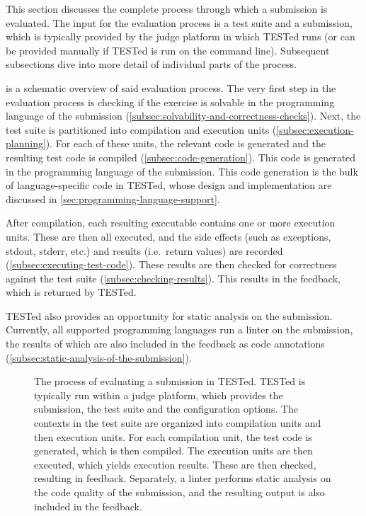 \documentclass[../main]{subfiles}
\begin{document}
This section discusses the complete process through which a submission is evaluated.
The input for the evaluation process is a test suite and a submission, which is typically provided by the judge platform in which TESTed runs (or can be provided manually if TESTed is run on the command line).
Subsequent subsections dive into more detail of individual parts of the process.

 is a schematic overview of said evaluation process.
The very first step in the evaluation process is checking if the exercise is solvable in the programming language of the submission (\cref{subsec:solvability-and-correctness-checks}).
Next, the test suite is partitioned into compilation and execution units (\cref{subsec:execution-planning}).
For each of these units, the relevant code is generated and the resulting test code is compiled (\cref{subsec:code-generation}).
This code is generated in the programming language of the submission.
This code generation is the bulk of language-specific code in TESTed, whose design and implementation are discussed in \cref{sec:programming-language-support}.

After compilation, each resulting executable contains one or more execution units.
These are then all executed, and the side effects (such as exceptions, stdout, stderr, etc.) and results (i.e.\ return values) are recorded (\cref{subsec:executing-test-code}).
These results are then checked for correctness against the test suite (\cref{subsec:checking-results}).
This results in the feedback, which is returned by TESTed.

TESTed also provides an opportunity for static analysis on the submission.
Currently, all supported programming languages run a linter on the submission, the results of which are also included in the feedback as code annotations (\cref{subsec:static-analysis-of-the-submission}).

\begin{figure}
    \centering
    
    \caption{
        The process of evaluating a submission in TESTed.
        TESTed is typically run within a judge platform, which provides the submission, the test suite and the configuration options.
        The contexts in the test suite are organized into compilation units and then execution units.
        For each compilation unit, the test code is generated, which is then compiled.
        The execution units are then executed, which yields execution results. These are then checked, resulting in feedback.
        Separately, a linter performs static analysis on the code quality of the submission, and the resulting output is also included in the feedback.
    }
    \label{fig:flow}
\end{figure}
\end{document}
